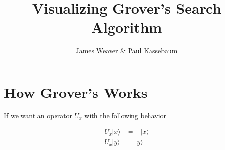 \documentclass[12pt]{amsart}
\title{Visualizing Grover's Search Algorithm}
\author{James Weaver \& Paul Kassebaum}
\date{} %
\begin{document}
\maketitle

\section{How Grover's Works}

If we want an operator $U_x$ with the following behavior

\begin{equation}
\begin{split}
U_x |x\rangle & = - |x\rangle \\
U_x |y\rangle & = |y\rangle 
\end{split}
\end{equation}
\end{document}
